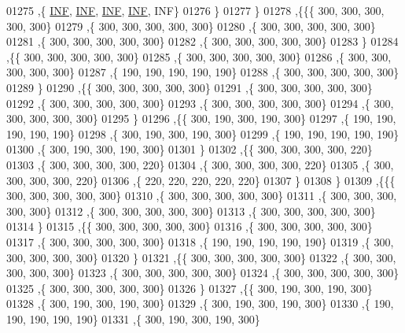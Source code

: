 \begin{DoxyCode}
01275    ,\{   \hyperlink{constants_8h_a12c2040f25d8e3a7b9e1c2024c618cb6}{INF},   \hyperlink{constants_8h_a12c2040f25d8e3a7b9e1c2024c618cb6}{INF},   \hyperlink{constants_8h_a12c2040f25d8e3a7b9e1c2024c618cb6}{INF},   \hyperlink{constants_8h_a12c2040f25d8e3a7b9e1c2024c618cb6}{INF},   INF\}
01276    \}
01277   \}
01278  ,\{\{\{   300,   300,   300,   300,   300\}
01279    ,\{   300,   300,   300,   300,   300\}
01280    ,\{   300,   300,   300,   300,   300\}
01281    ,\{   300,   300,   300,   300,   300\}
01282    ,\{   300,   300,   300,   300,   300\}
01283    \}
01284   ,\{\{   300,   300,   300,   300,   300\}
01285    ,\{   300,   300,   300,   300,   300\}
01286    ,\{   300,   300,   300,   300,   300\}
01287    ,\{   190,   190,   190,   190,   190\}
01288    ,\{   300,   300,   300,   300,   300\}
01289    \}
01290   ,\{\{   300,   300,   300,   300,   300\}
01291    ,\{   300,   300,   300,   300,   300\}
01292    ,\{   300,   300,   300,   300,   300\}
01293    ,\{   300,   300,   300,   300,   300\}
01294    ,\{   300,   300,   300,   300,   300\}
01295    \}
01296   ,\{\{   300,   190,   300,   190,   300\}
01297    ,\{   190,   190,   190,   190,   190\}
01298    ,\{   300,   190,   300,   190,   300\}
01299    ,\{   190,   190,   190,   190,   190\}
01300    ,\{   300,   190,   300,   190,   300\}
01301    \}
01302   ,\{\{   300,   300,   300,   300,   220\}
01303    ,\{   300,   300,   300,   300,   220\}
01304    ,\{   300,   300,   300,   300,   220\}
01305    ,\{   300,   300,   300,   300,   220\}
01306    ,\{   220,   220,   220,   220,   220\}
01307    \}
01308   \}
01309  ,\{\{\{   300,   300,   300,   300,   300\}
01310    ,\{   300,   300,   300,   300,   300\}
01311    ,\{   300,   300,   300,   300,   300\}
01312    ,\{   300,   300,   300,   300,   300\}
01313    ,\{   300,   300,   300,   300,   300\}
01314    \}
01315   ,\{\{   300,   300,   300,   300,   300\}
01316    ,\{   300,   300,   300,   300,   300\}
01317    ,\{   300,   300,   300,   300,   300\}
01318    ,\{   190,   190,   190,   190,   190\}
01319    ,\{   300,   300,   300,   300,   300\}
01320    \}
01321   ,\{\{   300,   300,   300,   300,   300\}
01322    ,\{   300,   300,   300,   300,   300\}
01323    ,\{   300,   300,   300,   300,   300\}
01324    ,\{   300,   300,   300,   300,   300\}
01325    ,\{   300,   300,   300,   300,   300\}
01326    \}
01327   ,\{\{   300,   190,   300,   190,   300\}
01328    ,\{   300,   190,   300,   190,   300\}
01329    ,\{   300,   190,   300,   190,   300\}
01330    ,\{   190,   190,   190,   190,   190\}
01331    ,\{   300,   190,   300,   190,   300\}

\end{DoxyCode}
